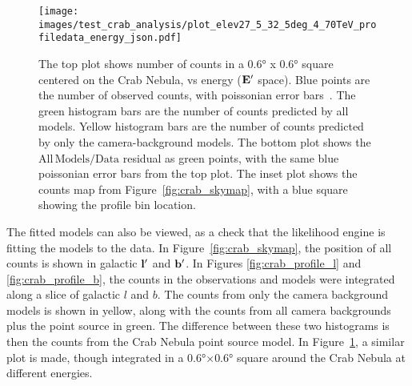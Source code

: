   \begin{figure}[!ht]
    \centering
    \texttt{[image: images/test\_crab\_analysis/plot\_elev27\_5\_32\_5deg\_4\_70TeV\_profiledata\_energy\_json.pdf]}
    \caption[Crab Nebula Profile in Energy]
    {
      The top plot shows number of counts in a \ang{0.6} x \ang{0.6} square centered on the Crab Nebula, vs energy ($\mathbf{E'}$ space).
      Blue points are the number of observed counts, with poissonian error bars~\cite{poissonfrequentistinterval}.
      The green histogram bars are the number of counts predicted by all models.
      Yellow histogram bars are the number of counts predicted by only the camera-background models.
      The bottom plot shows the $\mathrm{All\,Models}/\mathrm{Data}$ residual as green points, with the same blue poissonian error bars from the top plot.
      The inset plot shows the counts map from Figure~\ref{fig:crab_skymap}, with a blue square showing the profile bin location.
    }
    \label{fig:crab_profile_energy}
  \end{figure}
    
  The fitted models can also be viewed, as a check that the likelihood engine is fitting the models to the data.
  In Figure~\ref{fig:crab_skymap}, the position of all counts is shown in galactic $\mathbf{l'}$ and $\mathbf{b'}$.
  In Figures \ref{fig:crab_profile_l} and \ref{fig:crab_profile_b}, the counts in the observations and models were integrated along a slice of galactic $l$ and $b$.
  The counts from only the camera background models is shown in yellow, along with the counts from all camera backgrounds plus the point source in green.
  The difference between these two histograms is then the counts from the Crab Nebula point source model.
  In Figure~\ref{fig:crab_profile_energy}, a similar plot is made, though integrated in a \ang{0.6}$\times$\ang{0.6} square around the Crab Nebula at different energies.

